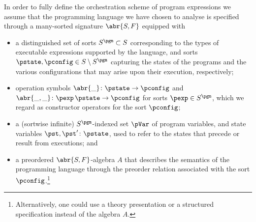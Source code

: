 \documentclass{LMCS}
\begin{document}
In order to fully define the orchestration scheme of program expressions we assume that the programming language we have chosen to analyse is specified through a many-sorted signature \(\abr{S, F}\) equipped with
\begin{itemize}

\item a distinguished set of sorts \(S^{\pgm} \subset S\) corresponding to the types of executable expressions supported by the language, and sorts \(\pstate, \pconfig \in S \setminus S^{\pgm}\) capturing the states of the programs and the various configurations that may arise upon their execution, respectively;

\item operation symbols \(\abr{\_} \colon \pstate \to \pconfig\) and \(\abr{\_, \_} \colon \pexp\, \pstate \to \pconfig\) for sorts \(\pexp \in S^{\pgm}\), which we regard as constructor operators for the sort \(\pconfig\);

\item a (sortwise infinite) \(S^{\pgm}\)\nb-indexed set \(\pVar\) of program variables, and state variables \(\pst, \pst' \colon \pstate\), used to refer to the states that precede or result from executions; and

\item a preordered \(\abr{S, F}\)\nb-algebra \(A\) that describes the semantics of the programming language through the preorder relation associated with the sort \(\pconfig\).\footnote{Alternatively, one could use a theory presentation or a structured specification instead of the algebra \(A\).}

\end{itemize}
\end{document}
